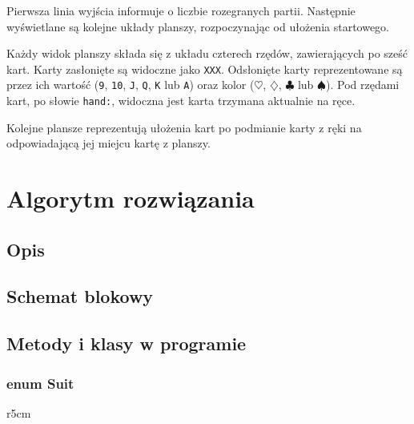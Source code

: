 \documentclass{article}
\newenvironment{enum}[3][]%
{
\begin{classAndInterfaceCommon}{#1}{#2}{#3}
}%
{\node[umlcd style enum, anchor=north] (\umlcdClassName) at (\umlcdClassPos)
    {$<<$enumeration$>>$ \\ \textbf{\umlcdClassName}
\nodepart{second}
\umlcdClassAttributes
};
\end{classAndInterfaceCommon}
}
\begin{document}
Pierwsza linia wyjścia informuje o liczbie rozegranych partii. Następnie wyświetlane są kolejne układy planszy, rozpoczynając od ułożenia startowego.

Każdy widok planszy składa się z układu czterech rzędów, zawierających po sześć kart. Karty zasłonięte są widoczne jako \texttt{XXX}. Odsłonięte karty reprezentowane są przez ich wartość (\texttt{9}, \texttt{10}, \texttt{J}, \texttt{Q}, \texttt{K} lub \texttt{A}) oraz kolor (\texttt{$\heartsuit$}, \texttt{$\diamondsuit$}, \texttt{$\clubsuit$} lub \texttt{$\spadesuit$}). Pod rzędami kart, po słowie \texttt{hand:}, widoczna jest karta trzymana aktualnie na ręce.

Kolejne plansze reprezentują ułożenia kart po podmianie karty z ręki na odpowiadającą jej miejcu kartę z planszy.

\section{Algorytm rozwiązania}
\subsection{Opis}
\subsection{Schemat blokowy}
\newpage
\subsection{Metody i klasy w programie}

\subsubsection*{enum Suit}

\setlength{\columnsep}{10pt}
\begin{wrapfigure}{r}{5cm}
    \centering
{}
\end{wrapfigure}
\end{document}

